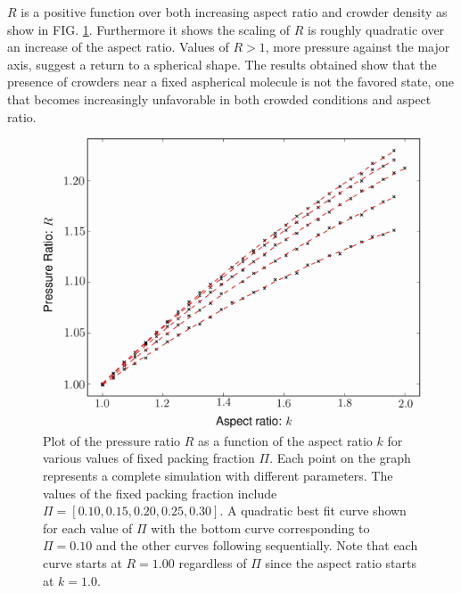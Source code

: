 $R$ is a positive function over both increasing aspect ratio and crowder density as show in FIG. \ref{fig:Pratio_plot}. Furthermore it shows the scaling of $R$ is roughly quadratic over an increase of the aspect ratio. Values of $R>1$, more pressure against the major axis, suggest a return to a spherical shape. The results obtained show that the presence of crowders near a fixed aspherical molecule is not the favored state, one that becomes increasingly unfavorable in both crowded conditions and aspect ratio. 

\begin{figure}
\includegraphics[width=\figurewidthSINGLE]{tex/entropic_flow_paper/FIG4_EDIT.jpg}
\caption{Plot of the pressure ratio $R$ as a function of the aspect ratio $k$ for various values of fixed packing fraction $\Pi$. Each point on the graph represents a complete simulation with different parameters. The values of the fixed packing fraction include $\Pi=[0.10,0.15,0.20,0.25,0.30]$. A quadratic best fit curve shown for each value of $\Pi$ with the bottom curve corresponding to $\Pi=0.10$ and the other curves following sequentially. Note that each curve starts at $R=1.00$ regardless of $\Pi$ since the aspect ratio starts at $k=1.0$. }
\label{fig:Pratio_plot}
\end{figure}

